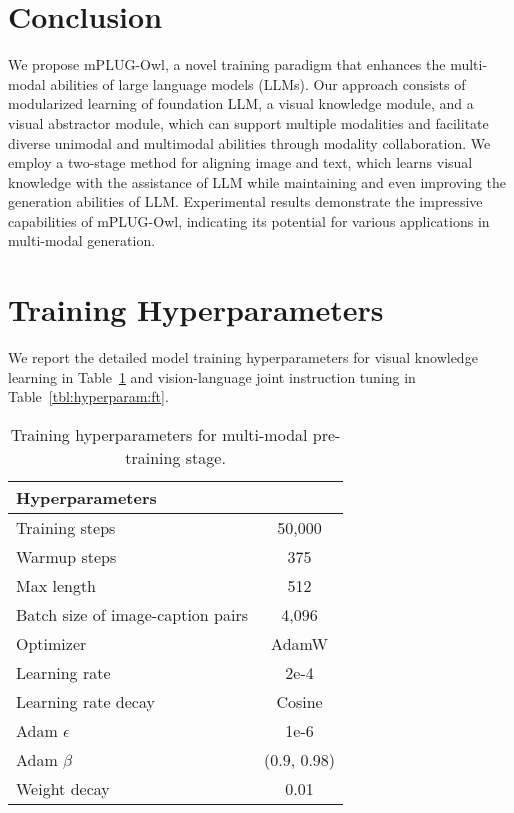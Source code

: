 \documentclass{article}
\newcommand{\modelname}{mPLUG-Owl\xspace}
\begin{document}
\section{Conclusion}
We propose \modelname, a novel training paradigm that enhances the multi-modal abilities of large language models (LLMs). Our approach consists of modularized learning of foundation LLM, a visual knowledge module, and a visual abstractor module, which can support multiple modalities and facilitate diverse unimodal and multimodal abilities through modality collaboration. We employ a two-stage method for aligning image and text, which learns visual knowledge with the assistance of LLM while maintaining and even improving the generation abilities of LLM. Experimental results demonstrate the impressive capabilities of \modelname, indicating its potential for various applications in multi-modal generation.


\clearpage




\clearpage
\newpage
\appendix
\section{Training Hyperparameters}
We report the detailed model training hyperparameters for visual knowledge learning in Table~\ref{tbl:hyperparam:pt} and vision-language joint instruction tuning in Table~\ref{tbl:hyperparam:ft}.


\begin{table}[ht]
\centering
\begin{tabular}{lc}
\toprule
\textbf{Hyperparameters} & \\ \midrule
Training steps             &       50,000 \\
Warmup steps                      &       375 \\
Max length        &       512 \\
Batch size of image-caption pairs  &       4,096 \\
Optimizer & AdamW \\
Learning rate & 2e-4 \\
Learning rate decay & Cosine \\
Adam $\epsilon$ & 1e-6 \\
Adam $\beta$ & (0.9, 0.98) \\
Weight decay & 0.01 \\
\bottomrule
\end{tabular}
\vspace{1ex}
\caption{Training hyperparameters for multi-modal pre-training stage.}
\label{tbl:hyperparam:pt}
\end{table}
\end{document}
